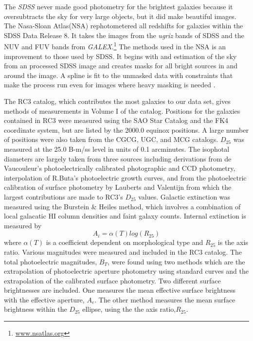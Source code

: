 \documentclass[12pt,preprint,pdftex]{aastex}
\newcommand{\project}[1]{\textsl{#1}}
\begin{document}
The \project{SDSS} never made good photometry for the brightest galaxies because it oversubtracts the sky for very large objects, but it did make beautiful images. The Nasa-Sloan Atlas(NSA) rephotometered all redshifts for galaxies within the SDSS Data Release 8. It takes the images from the \textit{ugriz} bands of SDSS and the NUV and FUV bands from \textit{GALEX}.\footnote{\url{www.nsatlas.org}} The methods used in the NSA is an improvement to those used by SDSS. It begins with and estimation of the sky from an processed SDSS image and creates masks for all bright sources in and around the image. A spline is fit to the unmasked data with constraints that make the process run even for images where heavy masking is needed \citep{blanton11}. 

The RC3 catalog, which contributes the most galaxies to our data set, gives methods of measurements in Volume I of the catalog. Positions for the galaxies contained in RC3 were measured using the SAO Star Catalog and the FK4 coordinate system, but are listed by the 2000.0 equinox positions. A large number of positions were also taken from the CGCG, UGC, and MCG catalogs. $D_{25}$ was measured at the 25.0 B-m/ss level in units of 0.1 arcminutes. The isophotal diameters are largely taken from three sources including derivations from de Vaucouleur's photoelectrically calibrated photographic and CCD photometry, interpolation of R.Buta's photoelectric growth curves, and from the photoelectric calibration of surface photometry by Lauberts and Valentijn from which the largest contributions are made to RC3's $D_{25}$ values. Galactic extinction was measured using the Burstein \& Heiles method, which involves a combination of local galacatic HI column densities and faint galaxy counts. Internal extinction is measured by \begin{equation} A_i= \alpha(T)log(R_{25}) \end{equation} where $\alpha(T)$ is a coefficient dependent on morphological type and $R_{25}$ is the axis ratio. Various magnitudes were measured and included in the RC3 catalog. The total photoelectric magnitudes, $B_T$, were found using two methods which are the extrapolation of photoelectric aperture photometry using standard curves and the extrapolation of the calibrated surface photometry. Two different surface brightnesses are included. One measures the mean effective surface brightness with the effective aperture, $A_e$. The other method measures the mean surface brightness within the $D_{25}$ ellipse, using the the axis ratio,$R_{25}$\citep{rc3}.
\end{document}
